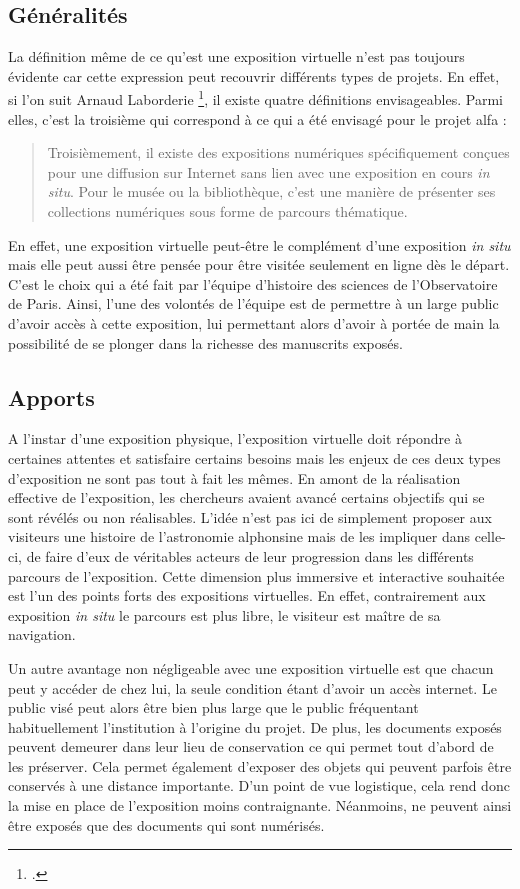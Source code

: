 	\subsection{Généralités}
	La définition même de ce qu'est une exposition virtuelle n'est pas toujours évidente car cette expression peut recouvrir différents types de projets. En effet, si l'on suit Arnaud Laborderie \footnote{\cite{laborderieExpositionsVirtuellesBnF2020}.}, il existe quatre définitions envisageables. Parmi elles, c'est la troisième qui correspond à ce qui a été envisagé pour le projet \acrshort{alfa} :
	\begin{quote}
	    Troisièmement, il existe des expositions numériques spécifiquement conçues pour une diffusion sur Internet sans lien avec une exposition en cours \textit{in situ}. Pour le musée ou la bibliothèque, c’est une manière de présenter ses collections numériques sous forme de parcours thématique.
	\end{quote}
	En effet, une exposition virtuelle peut-être le complément d'une exposition \textit{in situ} mais elle peut aussi être pensée pour être visitée seulement en ligne dès le départ. C'est le choix qui a été fait par l'équipe d'histoire des sciences de l'Observatoire de Paris. Ainsi, l'une des volontés de l'équipe est de permettre à un large public d'avoir accès à cette exposition, lui permettant alors d'avoir à portée de main la possibilité de se plonger dans la richesse des manuscrits exposés. 
	
	\subsection{Apports}
	A l'instar d'une exposition physique, l'exposition virtuelle doit répondre à certaines attentes et satisfaire certains besoins mais les enjeux de ces deux types d'exposition ne sont pas tout à fait les mêmes. En amont de la réalisation effective de l'exposition, les chercheurs avaient avancé certains objectifs qui se sont révélés ou non réalisables. L'idée n'est pas ici de simplement proposer aux visiteurs une histoire de l'astronomie alphonsine mais de les impliquer dans celle-ci, de faire d'eux de véritables acteurs de leur progression dans les différents parcours de l'exposition. Cette dimension plus immersive et interactive souhaitée est l'un des points forts des expositions virtuelles. En effet, contrairement aux exposition \textit{in situ} le parcours est plus libre, le visiteur est maître de sa navigation. 
	
	Un autre avantage non négligeable avec une exposition virtuelle est que chacun peut y accéder de chez lui, la seule condition étant d'avoir un accès internet. Le public visé peut alors être bien plus large que le public fréquentant habituellement l'institution à l'origine du projet. De plus, les documents exposés peuvent demeurer dans leur lieu de conservation ce qui permet tout d'abord de les préserver. Cela permet également d'exposer des objets qui peuvent parfois être conservés à une distance importante. D'un point de vue logistique, cela rend donc la mise en place de l'exposition moins contraignante. Néanmoins, ne peuvent ainsi être exposés que des documents qui sont numérisés.
	
